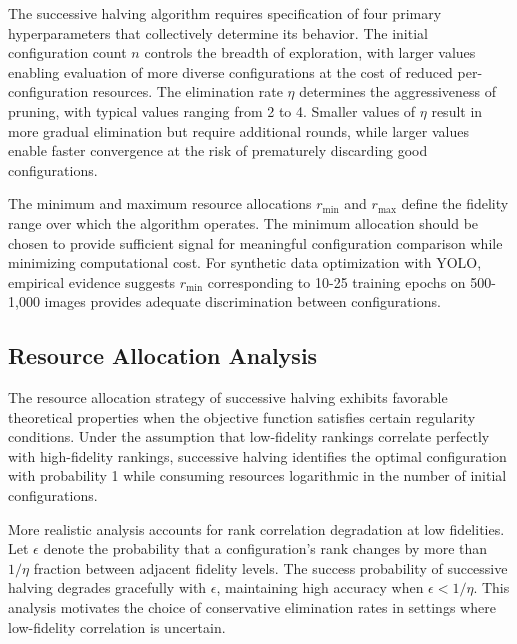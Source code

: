 The successive halving algorithm requires specification of four primary hyperparameters that collectively determine its behavior. The initial configuration count $n$ controls the breadth of exploration, with larger values enabling evaluation of more diverse configurations at the cost of reduced per-configuration resources. The elimination rate $\eta$ determines the aggressiveness of pruning, with typical values ranging from 2 to 4. Smaller values of $\eta$ result in more gradual elimination but require additional rounds, while larger values enable faster convergence at the risk of prematurely discarding good configurations.

The minimum and maximum resource allocations $r_{\min}$ and $r_{\max}$ define the fidelity range over which the algorithm operates. The minimum allocation should be chosen to provide sufficient signal for meaningful configuration comparison while minimizing computational cost. For synthetic data optimization with YOLO, empirical evidence suggests $r_{\min}$ corresponding to 10-25 training epochs on 500-1,000 images provides adequate discrimination between configurations.

\subsection{Resource Allocation Analysis}

The resource allocation strategy of successive halving exhibits favorable theoretical properties when the objective function satisfies certain regularity conditions. Under the assumption that low-fidelity rankings correlate perfectly with high-fidelity rankings, successive halving identifies the optimal configuration with probability 1 while consuming resources logarithmic in the number of initial configurations.

More realistic analysis accounts for rank correlation degradation at low fidelities. Let $\epsilon$ denote the probability that a configuration's rank changes by more than $1/\eta$ fraction between adjacent fidelity levels. The success probability of successive halving degrades gracefully with $\epsilon$, maintaining high accuracy when $\epsilon < 1/\eta$. This analysis motivates the choice of conservative elimination rates in settings where low-fidelity correlation is uncertain.


